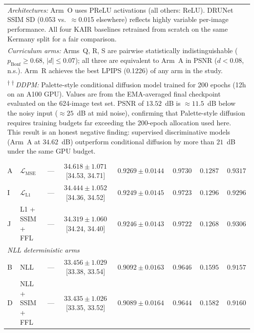 \documentclass[12pt, a4paper, twoside, openright]{book}
\begin{document}
\begin{landscape}
\begin{longtable}{llcccccc}
\multicolumn{8}{p{0.97\linewidth}}{\footnotesize
  \textit{Architectures:} Arm~O uses PReLU activations (all others: ReLU). DRUNet SSIM SD (0.053 vs.\ $\approx$0.015 elsewhere) reflects highly variable per-image performance. All four KAIR baselines retrained from scratch on the same Kermany split for a fair comparison.} \\[3pt]
\multicolumn{8}{p{0.97\linewidth}}{\footnotesize
  \textit{Curriculum arms:} Arms~Q, R, S are pairwise statistically indistinguishable ($p_{\mathrm{Bonf}} \geq 0.68$, $|d| \leq 0.07$); all three are equivalent to Arm~A in PSNR ($d < 0.08$, n.s.). Arm~R achieves the best LPIPS (0.1226) of any arm in the study.} \\[3pt]
\multicolumn{8}{p{0.97\linewidth}}{\footnotesize
  \textsuperscript{$\dagger\dagger$}\textit{DDPM:} Palette-style conditional diffusion model \cite{saharia_palette_2022} trained for 200 epochs (12h on an A100 GPU). Values are from the EMA-averaged final checkpoint evaluated on the 624-image test set. PSNR of $13.52$~dB is $\approx11.5$~dB below the noisy input ($\approx25$~dB at mid noise), confirming that Palette-style diffusion requires training budgets far exceeding the 200-epoch allocation used here. This result is an honest negative finding: supervised discriminative models (Arm~A at $34.62$~dB) outperform conditional diffusion by more than $21$~dB under the same GPU budget.} \\
\endlastfoot
%
\multicolumn{8}{l}{\textit{L2 / L1 deterministic arms}} \\
A & $\mathcal{L}_{\mathrm{MSE}}$    & --- & $\mathbf{34.618 \pm 1.071}$ {[34.53, 34.71]} & $\mathbf{0.9269 \pm 0.0144}$ & $\mathbf{0.9730}$ & $0.1287$ & $0.9317$ \\
I & $\mathcal{L}_{\mathrm{L1}}$     & --- & $34.444 \pm 1.052$ {[34.36, 34.52]}          & $0.9249 \pm 0.0145$          & $0.9723$          & $0.1296$ & $0.9296$ \\
J & L1 + SSIM + FFL                 & --- & $34.319 \pm 1.060$ {[34.24, 34.40]}          & $0.9246 \pm 0.0143$          & $0.9722$          & $0.1268$ & $0.9306$ \\
\midrule
\multicolumn{8}{l}{\textit{NLL deterministic arms}} \\
B & NLL                             & --- & $33.456 \pm 1.029$ {[33.38, 33.54]} & $0.9092 \pm 0.0163$ & $0.9646$ & $0.1595$ & $0.9157$ \\
D & NLL + SSIM + FFL                & --- & $33.435 \pm 1.026$ {[33.35, 33.52]} & $0.9089 \pm 0.0164$ & $0.9644$ & $0.1582$ & $0.9160$ \\

\end{longtable}
\end{landscape}
\end{document}
